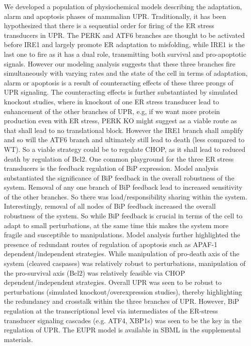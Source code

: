 \documentclass[fleqn,10pt]{wlscirep}
\begin{document}
We developed a population of physiochemical models describing the adaptation, alarm and apoptosis phases of mammalian UPR. Traditionally, it has been hypothesized that there is a sequential order for firing of the ER stress transducers in UPR. The PERK and ATF6 branches are thought to be activated before IRE1 \cite{szegezdi2006mediators} and largely promote ER adaptation to misfolding, while IRE1 is the last one to fire as it has a dual role, transmitting both survival and pro-apoptotic signals. However our modeling analysis suggests that these three branches fire simultaneously with varying rates and the state of the cell in terms of adaptation, alarm or apoptosis is a result of counteracting effects of these three prongs of UPR signaling. The counteracting effects is further substantiated by simulated knockout studies, where in knockout of one ER stress transducer lead to enhancement of the other branches of UPR, e.g, if we want more protein production even with ER stress, PERK KO might suggest as a viable route as that shall lead to no translational block. However the IRE1 branch shall amplify and so will the ATF6 branch and ultimately still lead to death (less compared to WT). So a viable strategy could be to regulate CHOP, as it shall lead to reduced death by regulation of Bcl2. One common playground for the three ER stress transducers is the feedback regulation of BiP expression. Model analysis substantiated the significance of BiP feedback in the overall robustness of the system. Removal of any one branch of BiP feedback lead to increased sensitivity of the other branches. So there was load/responsibility sharing within the system. Interestingly, removal of all nodes of BiP feedback increased the overall robustness of the system. So while BiP feedback is crucial in terms of the cell to adapt to small perturbations, at the same time this makes the system more fragile and susceptible to manipulations. Model analysis further highlighted the presence of redundant routes of regulation of apoptosis such as APAF-1 dependent/independent strategies. While manipulation of pro-death axis of the system (cleaved caspases) was relatively robust to perturbations, manipulation of the pro-survival axis (Bcl2) was relatively feasible via CHOP dependent/independent strategies. Overall UPR was seen to be robust to perturbations (simulated knockout/overexpression studies), thereby highlighting the redundancy and crosstalk within the three branches of UPR. However, BiP regulation at the transcriptional level via intermediates of the ER-stress transducer signaling cascades (e.g. ATF4, XBP1s) was seen to be the key in the regulation of UPR. The EUPR model is available in SBML in the supplemental materials.
\end{document}
